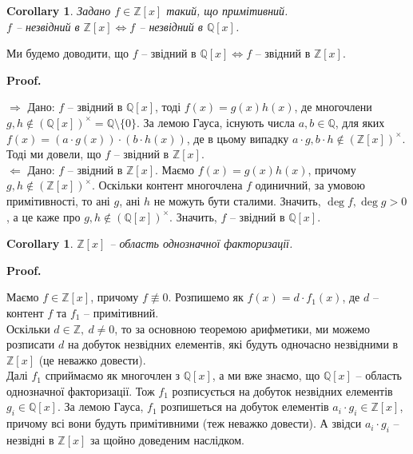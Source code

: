 \documentclass[a4paper, 10pt]{article}
\makeatletter
\def\rightproof{$\boxed{\Rightarrow}$ }
\def\leftproof{$\boxed{\Leftarrow}$ }
\theoremstyle{theoremdd}
\theoremstyle{theoremdd}
\theoremstyle{theoremdd}
\theoremstyle{theoremdd}
\theoremstyle{theoremdd}
\theoremstyle{theoremdd}
\theoremstyle{theoremdd}
\theoremstyle{theoremdd}
\theoremstyle{theoremdd}
\theoremstyle{theoremdd}
\theoremstyle{theoremdd}
\theoremstyle{theoremdd}
\theoremstyle{theoremdd}
\theoremstyle{theoremdd}
\newtheorem{corollary}[theorem]{Corollary}
\theoremstyle{theoremdd}
\renewenvironment{proof}[1][Proof.\\]{\par
\pushQED{\hfill \qed}%
\normalfont \topsep6\p@\@plus6\p@\relax
\trivlist
\item\relax
{\bfseries
#1\@addpunct{.}}\hspace\labelsep\ignorespaces
}{%
\popQED\endtrivlist\@endpefalse
}
\makeatother
\begin{document}
\begin{corollary}
Задано $f \in \mathbb{Z}[x]$ такий, що примітивний.\\
$f$ -- незвідний в $\mathbb{Z}[x] \iff f$ -- незвідний в $\mathbb{Q}[x]$.
\end{corollary}

Ми будемо доводити, що $f$ -- звідний в $\mathbb{Q}[x] \iff f$ -- звідний в $\mathbb{Z}[x]$.

\begin{proof}
\rightproof Дано: $f$ -- звідний в $\mathbb{Q}[x]$, тоді $f(x) = g(x)h(x)$, де многочлени $g,h \notin (\mathbb{Q}[x])^\times = \mathbb{Q} \setminus \{0\}$. За лемою Гауса, існують числа $a,b \in \mathbb{Q}$, для яких $f(x) = (a \cdot g(x)) \cdot (b \cdot h(x))$, де в цьому випадку $a \cdot g, b \cdot h \notin (\mathbb{Z}[x])^\times$. Тоді ми довели, що $f$ -- звідний в $\mathbb{Z}[x]$.
\bigskip \\
\leftproof Дано: $f$ -- звідний в $\mathbb{Z}[x]$. Маємо $f(x) = g(x)h(x)$, причому $g,h \notin (\mathbb{Z}[x])^\times$. Оскільки контент многочлена $f$ одиничний, за умовою примітивності, то ані $g$, ані $h$ не можуть бути сталими. Значить, $\deg f, \deg g > 0$, а це каже про $g,h \notin (\mathbb{Q}[x])^\times$. Значить, $f$ -- звідний в $\mathbb{Q}[x]$.
\end{proof}

\begin{corollary}
$\mathbb{Z}[x]$ -- область однозначної факторизації.
\end{corollary}

\begin{proof}
Маємо $f \in \mathbb{Z}[x]$, причому $f \not\equiv 0$. Розпишемо як $f(x) = d \cdot f_1(x)$, де $d$ -- контент $f$ та $f_1$ -- примітивний.\\
Оскільки $d \in \mathbb{Z},\ d \neq 0$, то за основною теоремою арифметики, ми можемо розписати $d$ на добуток незвідних елементів, які будуть одночасно незвідними в $\mathbb{Z}[x]$ (це неважко довести).\\
Далі $f_1$ сприймаємо як многочлен з $\mathbb{Q}[x]$, а ми вже знаємо, що $\mathbb{Q}[x]$ -- область однозначної факторизації. Тож $f_1$ розписується на добуток незвідних елементів $g_i \in \mathbb{Q}[x]$. За лемою Гауса, $f_1$ розпишеться на добуток елементів $a_i \cdot g_i \in \mathbb{Z}[x]$, причому всі вони будуть примітивними (теж неважко довести). А звідси $a_i \cdot g_i$ -- незвідні в $\mathbb{Z}[x]$ за щойно доведеним наслідком.
\end{proof}
\end{document}
